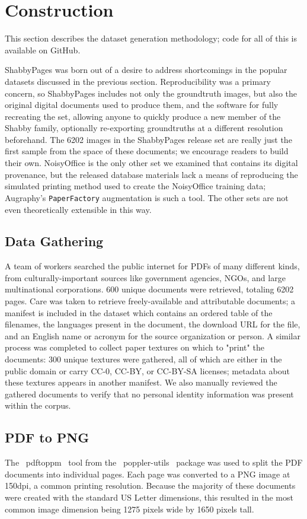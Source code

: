 \documentclass[runningheads]{llncs}
\begin{document}
\section{Construction}
This section describes the dataset generation methodology; code for all of this is available on GitHub.

ShabbyPages was born out of a desire to address shortcomings in the popular datasets discussed in the previous section.
Reproducibility was a primary concern, so ShabbyPages includes not only the groundtruth images, but also the original digital documents used to produce them, and the software for fully recreating the set, allowing anyone to quickly produce a new member of the Shabby family, optionally re-exporting groundtruths at a different resolution beforehand.
The 6202 images in the ShabbyPages release set are really just the first sample from the space of these documents; we encourage readers to build their own.
NoisyOffice is the only other set we examined that contains its digital provenance, but the released database materials lack a means of reproducing the simulated printing method used to create the NoisyOffice training data; Augraphy's \texttt{PaperFactory} augmentation is such a tool.
The other sets are not even theoretically extensible in this way.

\subsection{Data Gathering}
A team of workers searched the public internet for PDFs of many different kinds, from culturally-important sources like government agencies, NGOs, and large multinational corporations.
600 unique documents were retrieved, totaling 6202 pages.
Care was taken to retrieve freely-available and attributable documents; a manifest is included in the dataset which contains an ordered table of the filenames, the languages present in the document, the download URL for the file, and an English name or acronym for the source organization or person.
A similar process was completed to collect paper textures on which to "print" the documents: 300 unique textures were gathered, all of which are either in the public domain or carry CC-0, CC-BY, or CC-BY-SA licenses; metadata about these textures appears in another manifest.
We also manually reviewed the gathered documents to verify that no personal identity information was present within the corpus.

\subsection{PDF to PNG}
The ~pdftoppm~ tool from the ~poppler-utils~ package was used to split the PDF documents into individual pages.
Each page was converted to a PNG image at 150dpi, a common printing resolution.
Because the majority of these documents were created with the standard US Letter dimensions, this resulted in the most common image dimension being 1275 pixels wide by 1650 pixels tall.
\end{document}
